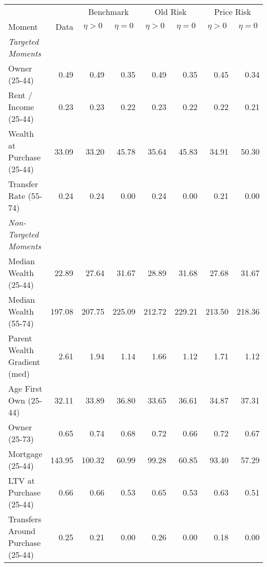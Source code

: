 \begin{tabular}{lr rr rr rr}
 \toprule & & \multicolumn{2}{c}{Benchmark} & \multicolumn{2}{c}{Old Risk} & \multicolumn{2}{c}{Price Risk}
 \\  \cmidrule(lr){3-4}\cmidrule(lr){5-6}\cmidrule(lr){7-8}
Moment & Data & \multicolumn{1}{c}{$ \eta>0 $} & \multicolumn{1}{c}{$ \eta=0 $} & \multicolumn{1}{c}{$ \eta>0 $} & \multicolumn{1}{c}{$ \eta=0 $} & \multicolumn{1}{c}{$ \eta>0 $} & \multicolumn{1}{c}{$ \eta=0 $}\\
\midrule
\textit{Targeted Moments} &  &  &  &  &  &  & \\
\;Owner (25-44) & 0.49 & 0.49 & 0.35 & 0.49 & 0.35 & 0.45 & 0.34\\
\;Rent / Income (25-44) & 0.23 & 0.23 & 0.22 & 0.23 & 0.22 & 0.22 & 0.21\\
\;Wealth at Purchase (25-44) & 33.09 & 33.20 & 45.78 & 35.64 & 45.83 & 34.91 & 50.30\\
\;Transfer Rate (55-74) & 0.24 & 0.24 & 0.00 & 0.24 & 0.00 & 0.21 & 0.00\\
\textit{Non-Targeted Moments} &  &  &  &  &  &  & \\
\;Median Wealth (25-44) & 22.89 & 27.64 & 31.67 & 28.89 & 31.68 & 27.68 & 31.67\\
\;Median Wealth (55-74) & 197.08 & 207.75 & 225.09 & 212.72 & 229.21 & 213.50 & 218.36\\
\;Parent Wealth Gradient (med) & 2.61 & 1.94 & 1.14 & 1.66 & 1.12 & 1.71 & 1.12\\
\;Age First Own (25-44) & 32.11 & 33.89 & 36.80 & 33.65 & 36.61 & 34.87 & 37.31\\
\;Owner (25-73) & 0.65 & 0.74 & 0.68 & 0.72 & 0.66 & 0.72 & 0.67\\
\;Mortgage (25-44) & 143.95 & 100.32 & 60.99 & 99.28 & 60.85 & 93.40 & 57.29\\
\;LTV at Purchase (25-44) & 0.66 & 0.66 & 0.53 & 0.65 & 0.53 & 0.63 & 0.51\\
\;Transfers Around Purchase (25-44) & 0.25 & 0.21 & 0.00 & 0.26 & 0.00 & 0.18 & 0.00\\
\bottomrule
\end{tabular}
